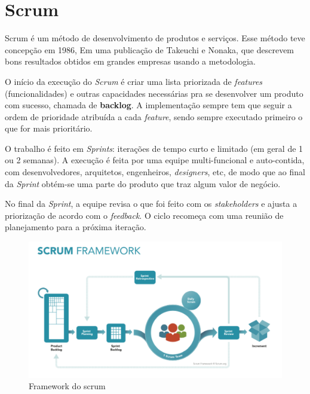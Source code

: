     \section{Scrum } %
        Scrum\cite{essentialscrum} é um método de desenvolvimento de produtos e serviços. Esse método teve concepção em 1986, Em uma publicação\cite{scrumorigin} de Takeuchi e Nonaka, que descrevem bons resultados obtidos em grandes empresas usando a metodologia.
        
        O início da execução do \textit{Scrum} é criar uma lista priorizada de \textit{features} (funcionalidades) e outras capacidades necessárias pra se desenvolver um produto com sucesso, chamada de \textbf{backlog}. A implementação sempre tem que seguir a ordem de prioridade atribuída a cada \textit{feature}, sendo sempre executado primeiro o que for mais prioritário.
        
        O trabalho é feito em \textit{Sprints}: iterações de tempo curto e limitado (em geral de 1 ou 2 semanas). A execução é feita por uma equipe multi-funcional e auto-contida, com desenvolvedores, arquitetos, engenheiros, \textit{designers}, etc, de modo que ao final da \textit{Sprint} obtém-se uma parte do produto que traz algum valor de negócio.
        
        No final da \textit{Sprint}, a equipe revisa o que foi feito com os \textit{stakeholders} e ajusta a priorização de acordo com o \textit{feedback}. O ciclo recomeça com uma reunião de planejamento para a próxima iteração.
        
        \begin{figure}[htb]
    		\caption{\label{fig:scrum} Framework do scrum}
    		\begin{center}
    		\includegraphics[width=\textwidth,keepaspectratio]{pictures/ScrumFrameworkTest.png}
    		\end{center}
    	\end{figure}

